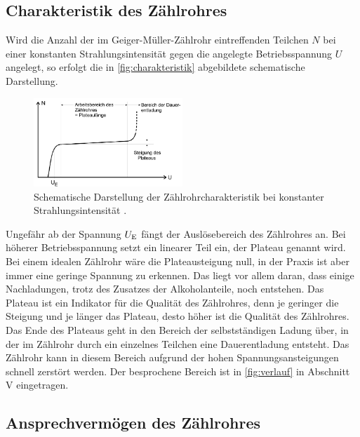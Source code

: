 \subsection{Charakteristik des Zählrohres}
\label{subsec:ZaehlrohrCharakteristik}

Wird die Anzahl der im Geiger-Müller-Zählrohr eintreffenden Teilchen $N$ bei einer konstanten Strahlungsintensität gegen die angelegte Betriebsspannung $U$ angelegt, so erfolgt die in \autoref{fig:charakteristik} abgebildete schematische Darstellung.
\begin{figure}[H]
    \centering
    \includegraphics[width=0.5\textwidth]{data/charakteristik.png}
    \caption{Schematische Darstellung der Zählrohrcharakteristik bei konstanter Strahlungsintensität \cite{Anleitung703}.}
    \label{fig:charakteristik}
\end{figure}

Ungefähr ab der Spannung $U_\text E$ fängt der Auslösebereich des Zählrohres an. Bei höherer Betriebsspannung setzt ein linearer Teil ein, der Plateau genannt wird. Bei einem idealen Zählrohr wäre die Plateausteigung null, in der Praxis ist aber immer eine geringe Spannung zu erkennen.
Das liegt vor allem daran, dass einige Nachladungen, trotz des Zusatzes der Alkoholanteile, noch entstehen. Das Plateau ist ein Indikator für die Qualität des Zählrohres, denn je geringer die Steigung und je länger das Plateau, desto höher ist die Qualität des Zählrohres.
Das Ende des Plateaus geht in den Bereich der selbstständigen Ladung über, in der im Zählrohr durch ein einzelnes Teilchen eine Dauerentladung entsteht. Das Zählrohr kann in diesem Bereich aufgrund der hohen Spannungsansteigungen schnell zerstört werden.
Der besprochene Bereich ist in \autoref{fig:verlauf} in Abschnitt \RN{5} eingetragen.

\subsection{Ansprechvermögen des Zählrohres}
\label{subsec:Ansprechvermoegen}

